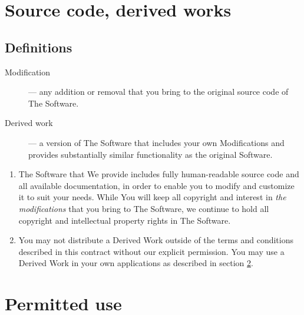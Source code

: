 \documentclass[a4paper,10pt]{article}
\begin{document}
\section{Source code, derived works}\label{sec:4}

\subsection{Definitions}

\begin{description}

  \item [Modification] — any addition or removal that you bring to the original
    source code of The Software.

  \item [Derived work] — a version of The Software that includes your own
    Modifications and provides substantially similar functionality as the
    original Software.

\end{description}

\begin{enumerate}

  \item The Software that We provide includes fully human-readable source code
    and all available documentation, in order to enable you to modify and
    customize it to suit your needs.  While You will keep all copyright and
    interest in \emph{the modifications} that you bring to The Software, we
    continue to hold all copyright and intellectual property rights in The
    Software.

  \item You may not distribute a Derived Work outside of the terms and
    conditions described in this contract without our explicit permission.  You
    may use a Derived Work in your own applications as described in section
    \ref{sec:premittedUse}.

\end{enumerate}

\section{Permitted use}\label{sec:premittedUse}\label{sec:5}
\end{document}
